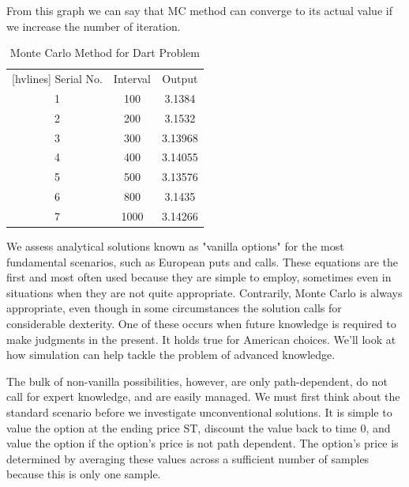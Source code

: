 \noindent From this graph we can say that MC method can converge to its actual value if we increase the number of iteration. 

\begin{table}[H]
	\begin{center}
		\begin{NiceTabular}{|c|c|c|}[hvlines]
			 Serial No. & Interval & Output  \\ 
			1 & 100 & 3.1384 \\
			2 & 200 & 3.1532 \\
			3 & 300 & 3.13968 \\
			4 & 400 & 3.14055 \\
			5 & 500 & 3.13576  \\ 
			6 & 800 & 3.1435  \\ 
			7 & 1000 & 3.14266  \\
			
		\end{NiceTabular}
	\end{center}
	\caption{Monte Carlo Method for Dart Problem}
\end{table}


\noindent We assess analytical solutions known as "vanilla options" for the most fundamental scenarios, such as European puts and calls. These equations are the first and most often used because they are simple to employ, sometimes even in situations when they are not quite appropriate. Contrarily, Monte Carlo is always appropriate, even though in some circumstances the solution calls for considerable dexterity. One of these occurs when future knowledge is required to make judgments in the present. It holds true for American choices. We'll look at how simulation can help tackle the problem of advanced knowledge.

The bulk of non-vanilla possibilities, however, are only path-dependent, do not call for expert knowledge, and are easily managed. We must first think about the standard scenario before we investigate unconventional solutions. It is simple to value the option at the ending price ST, discount the value back to time 0, and value the option if the option's price is not path dependent. The option's price is determined by averaging these values across a sufficient number of samples because this is only one sample.

